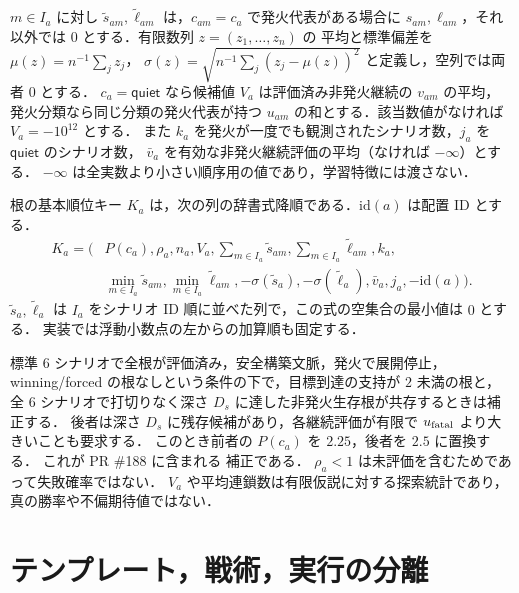 $m\in I_a$ に対し $\tilde s_{am},\tilde\ell_{am}$ は，$c_{am}=c_a$ で発火代表がある場合に
$s_{am},\ell_{am}$，それ以外では $0$ とする．有限数列 $z=(z_1,\ldots,z_n)$ の
平均と標準偏差を $\mu(z)=n^{-1}\sum_jz_j$，
$\sigma(z)=\sqrt{n^{-1}\sum_j(z_j-\mu(z))^2}$ と定義し，空列では両者 $0$ とする．
$c_a=\mathsf{quiet}$ なら候補値 $V_a$ は評価済み非発火継続の $v_{am}$ の平均，
発火分類なら同じ分類の発火代表が持つ $u_{am}$ の和とする．該当数値がなければ $V_a=-10^{12}$ とする．
また $k_a$ を発火が一度でも観測されたシナリオ数，$j_a$ を $\mathsf{quiet}$ のシナリオ数，
$\bar v_a$ を有効な非発火継続評価の平均（なければ $-\infty$）とする．
$-\infty$ は全実数より小さい順序用の値であり，学習特徴には渡さない．

根の基本順位キー $K_a$ は，次の列の辞書式降順である．$\mathrm{id}(a)$ は配置 ID とする．
\begin{equation}\label{eq:rootrank}
\begin{split}
 K_a=(&P(c_a),\rho_a,n_a,V_a,
 \textstyle\sum_{m\in I_a}\tilde s_{am},\sum_{m\in I_a}\tilde\ell_{am},k_a,\\
 &\min_{m\in I_a}\tilde s_{am},\min_{m\in I_a}\tilde\ell_{am},
 -\sigma(\tilde s_a),-\sigma(\tilde\ell_a),\bar v_a,j_a,-\mathrm{id}(a)).
\end{split}
\end{equation}
$\tilde s_a,\tilde\ell_a$ は $I_a$ をシナリオ ID 順に並べた列で，この式の空集合の最小値は $0$ とする．
実装では浮動小数点の左からの加算順も固定する．

標準 $6$ シナリオで全根が評価済み，安全構築文脈，発火で展開停止，
winning/forced の根なしという条件の下で，目標到達の支持が $2$ 未満の根と，
全 $6$ シナリオで打切りなく深さ $D_s$ に達した非発火生存根が共存するときは補正する．
後者は深さ $D_s$ に残存候補があり，各継続評価が有限で $u_{\rm fatal}$ より大きいことも要求する．
このとき前者の $P(c_a)$ を $2.25$，後者を $2.5$ に置換する．
これが PR \#188 に含まれる  補正である．
$\rho_a<1$ は未評価を含むためであって失敗確率ではない．
$V_a$ や平均連鎖数は有限仮説に対する探索統計であり，真の勝率や不偏期待値ではない．

\section{テンプレート，戦術，実行の分離}\label{sec:tactics}
